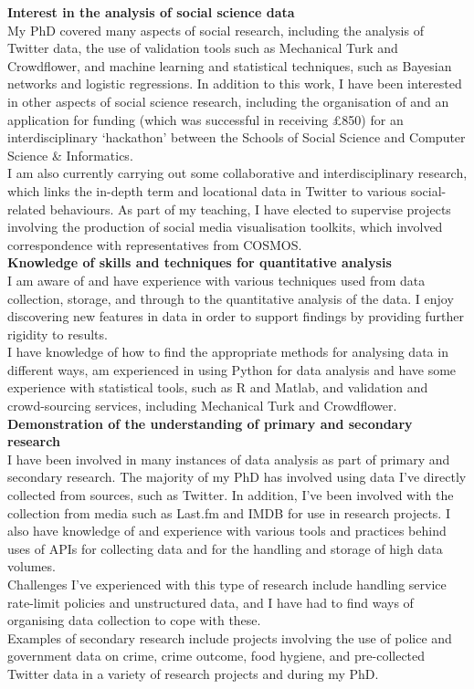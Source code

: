 \documentclass[11pt,a4paper]{article}
\begin{document}
\textbf{Interest in the analysis of social science data}\\
My PhD covered many aspects of social research, including the analysis of Twitter data, the use of validation tools such as Mechanical Turk and Crowdflower, and machine learning and statistical techniques, such as Bayesian networks and logistic regressions. In addition to this work, I have been interested in other aspects of social science research, including the organisation of and an application for funding (which was successful in receiving £850) for an interdisciplinary `hackathon' between the Schools of Social Science and Computer Science \& Informatics.\\
I am also currently carrying out some collaborative and interdisciplinary research, which links the in-depth term and locational data in Twitter to various social-related behaviours. As part of my teaching, I have elected to supervise projects involving the production of social media visualisation toolkits, which involved correspondence with representatives from COSMOS.\\

\textbf{Knowledge of skills and techniques for quantitative analysis}\\
I am aware of and have experience with various techniques used from data collection, storage, and through to the quantitative analysis of the data. I enjoy discovering new features in data in order to support findings by providing further rigidity to results.\\
I have knowledge of how to find the appropriate methods for analysing data in different ways, am experienced in using Python for data analysis and have some experience with statistical tools, such as R and Matlab, and validation and crowd-sourcing services, including Mechanical Turk and Crowdflower.\\

\textbf{Demonstration of the understanding of primary and secondary research}\\
I have been involved in many instances of data analysis as part of primary and secondary research. The majority of my PhD has involved using data I've directly collected from sources, such as Twitter. In addition, I've been involved with the collection from media such as Last.fm and IMDB for use in research projects. I also have knowledge of and experience with various tools and practices behind uses of APIs for collecting data and for the handling and storage of high data volumes.\\
Challenges I've experienced with this type of research include handling service rate-limit policies and unstructured data, and I have had to find ways of organising data collection to cope with these.\\
Examples of secondary research include projects involving the use of police and government data on crime, crime outcome, food hygiene, and pre-collected Twitter data in a variety of research projects and during my PhD.\\
\end{document}

